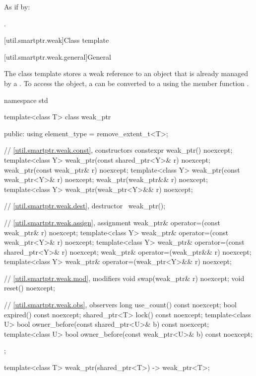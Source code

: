 \begin{itemdescr}
\pnum
\effects
As if by: 

\pnum
\returns
{}.
\end{itemdescr}

[util.smartptr.weak]{Class template }

[util.smartptr.weak.general]{General}

\pnum
{}%
The  class template stores a weak reference to an object
that is already managed by a . To access the object, a
 can be converted to a  using the member
function .

\begin{codeblock}
namespace std {
  template<class T> class weak_ptr {
  public:
    using element_type = remove_extent_t<T>;

    // \ref{util.smartptr.weak.const}, constructors
    constexpr weak_ptr() noexcept;
    template<class Y>
      weak_ptr(const shared_ptr<Y>& r) noexcept;
    weak_ptr(const weak_ptr& r) noexcept;
    template<class Y>
      weak_ptr(const weak_ptr<Y>& r) noexcept;
    weak_ptr(weak_ptr&& r) noexcept;
    template<class Y>
      weak_ptr(weak_ptr<Y>&& r) noexcept;

    // \ref{util.smartptr.weak.dest}, destructor
    ~weak_ptr();

    // \ref{util.smartptr.weak.assign}, assignment
    weak_ptr& operator=(const weak_ptr& r) noexcept;
    template<class Y>
      weak_ptr& operator=(const weak_ptr<Y>& r) noexcept;
    template<class Y>
      weak_ptr& operator=(const shared_ptr<Y>& r) noexcept;
    weak_ptr& operator=(weak_ptr&& r) noexcept;
    template<class Y>
      weak_ptr& operator=(weak_ptr<Y>&& r) noexcept;

    // \ref{util.smartptr.weak.mod}, modifiers
    void swap(weak_ptr& r) noexcept;
    void reset() noexcept;

    // \ref{util.smartptr.weak.obs}, observers
    long use_count() const noexcept;
    bool expired() const noexcept;
    shared_ptr<T> lock() const noexcept;
    template<class U>
      bool owner_before(const shared_ptr<U>& b) const noexcept;
    template<class U>
      bool owner_before(const weak_ptr<U>& b) const noexcept;
  };

  template<class T>
    weak_ptr(shared_ptr<T>) -> weak_ptr<T>;
}
\end{codeblock}


